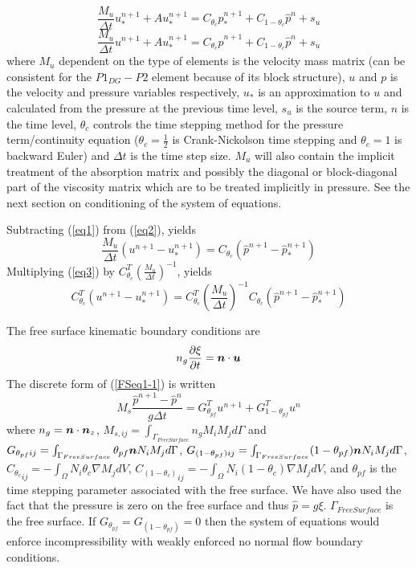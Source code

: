 \begin{equation}
\frac{M_u}{\Delta t}u_*^{n+1}+Au_*^{n+1}=  C_{\theta_c} {\hat p}_*^{n+1}
+C_{1-\theta_c} {\hat p}^n+s_u
\label{eq1}
\end{equation}
\begin{equation}
\frac{M_u}{\Delta t}u^{n+1}+Au_*^{n+1}=C_{\theta_c} {\hat p}^{n+1}
+C_{1-\theta_c} {\hat p}^n+s_u
\label{eq2}
\end{equation}
where $M_u$ dependent on the type of elements is the velocity mass matrix (can be consistent
for the $P1_{DG}-P2$ element because of its block structure),
$u$ and $p$ is the velocity and pressure variables respectively,
$u_*$ is an approximation to $u$ and calculated from the
pressure at the previous time level,
$s_u$ is the source term, $n$ is the time level, $\theta_c$ controls
the time stepping method for the pressure term/continuity equation
($\theta_c=\frac{1}{2}$ is Crank-Nickolson time stepping and
$\theta_c=1$ is backward Euler)
and $\Delta t$ is the time step size. $M_u$ will also contain the
implicit treatment of the absorption matrix and possibly the diagonal or block-diagonal
part of
the viscosity matrix which are to be treated implicitly in pressure. See
the next section on conditioning of the system of equations.

\noindent Subtracting (\ref{eq1}) from (\ref{eq2}), yields
\begin{equation}
\frac{M_u}{\Delta t}(u^{n+1}-u_*^{n+1})= C_{\theta_c} ({\hat p}^{n+1}-{\hat p}_*^{n+1})
\label{u-eqn}
\end{equation}
\noindent Multiplying (\ref{eq3}) by $C_{\theta_c}^T (\frac{M_u}{\Delta t})^{-1}$, yields
\begin{equation}
C_{\theta_c}^T (u^{n+1}-u_*^{n+1})=
C_{\theta_c}^T \left(\frac{M_u}{\Delta t}\right)^{-1}
C_{\theta_c} ({\hat p}^{n+1}-{\hat p}_*^{n+1})
\label{eq3}
\end{equation}

\noindent The free surface kinematic boundary conditions are
\begin{equation}
 n_g\frac{\partial \xi}{\partial t} = {\mbox{\boldmath$n$}} \cdot {\mbox{\boldmath$u$}}
\label{FSeq1-1}
\end{equation}
\noindent The discrete form of (\ref{FSeq1-1}) is written
\begin{equation}
 M_s\frac{{\hat p}^{n+1}-{\hat p}^n}{g \Delta t} =
G_{{\theta_{pf}}}^T u^{n+1}  +G_{{1-\theta_{pf}}}^T u^{n}
\label{FSeq2}
\end{equation}
where $n_g={\mbox{\boldmath$n$}}\cdot {\mbox{\boldmath$n$}}_z$,
$M_{s,ij}=\int_{\Gamma_{Free Surface}}n_gM_iM_j d \Gamma$
 and $G_{\theta_{pf} ij}=\int_{\Gamma_{Free Surface}}\theta_{pf} {\mbox{\boldmath$n$}}  N_iM_j d \Gamma $,
 $G_{(1-\theta_{pf}) ij}=\int_{\Gamma_{Free Surface}}(1-\theta_{pf}) {\mbox{\boldmath$n$}}  N_iM_j d \Gamma $,
 ${C_{\theta_c}}_{ij}=-\int_\Omega N_i \theta_c \nabla M_j d V$,
 ${C_{(1-\theta_c)}}_{ij}=-\int_\Omega N_i (1-\theta_c) \nabla M_j d V$,
 and $\theta_{pf}$ is the time stepping parameter associated with the free surface. We have
 also used the fact that the pressure is zero on the free surface
 and thus ${\hat p}=g\xi$.
$\Gamma_{Free Surface}$ is the free surface.
If $G_{\theta_{pf}}=G_{(1-\theta_{pf})}=0$ then the system
of equations would enforce incompressibility with weakly enforced no normal flow
boundary conditions.

